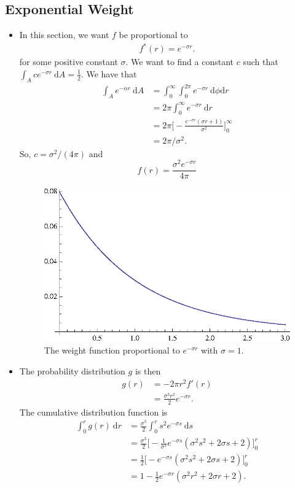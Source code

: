 \documentclass[10pt]{article}
\newcommand{\dee}{\mathrm{d}}
\begin{document}
\subsection{Exponential Weight}
\begin{itemize}
	\item In this section, we want $f$ be proportional to 
		\begin{align*}
			f^*(r) = e^{-\sigma r}.
		\end{align*}
		for some positive constant $\sigma$.
		We want to find a constant $c$ such that 
		$\int_A ce^{-\sigma r}\ \dee A = \frac{1}{2}.$ 
		We have that
		\begin{align*}
			\int_A e^{-\alpha r}\ \dee A 
			&= \int_0^\infty \int_0^{2\pi} e^{-\sigma r}\ \dee \phi \dee r\\
			&= 2\pi \int_0^{\infty} e^{-\sigma r} \ \dee r\\
			&= 2\pi \bigg[ - 
				\frac{e^{-\sigma r}(\sigma r  + 1)}{\sigma^2} \bigg]_0^\infty\\
			&= 2\pi /\sigma^2.
		\end{align*}
		So, $c = \sigma^2 / (4\pi)$ and 
		$$f(r) = \frac{\sigma^2 e^{-\sigma r}}{4\pi} $$

		\begin{figure}[h]
			\centering
			\includegraphics{exponential.eps}
			\caption{The weight function proportional to $e^{-\sigma r}$ with $\sigma = 1$.}
		\end{figure}		
	
	\item The probability distribution $g$ is then
		\begin{align*}
			g(r) 
			&= -2\pi r^2 f'(r)\\
			&= \frac{\sigma^3 r^2}{2} e^{-\sigma r}.
		\end{align*}
		The cumulative distribution function is
		\begin{align*}
			\int_0^r g(r)\ \dee r
			&= \frac{\sigma^3}{2} \int_0^r s^2 e^{-\sigma s}\ \dee s\\
			&= \frac{\sigma^3}{2} 
				\bigg[ - \frac{1}{\sigma^3} e^{-\sigma s} 
				(\sigma^2 s^2 + 2\sigma s + 2)\bigg]_0^r\\
			&= \frac{1}{2} 
				\bigg[- e^{-\sigma s} 
				(\sigma^2 s^2 + 2\sigma s + 2) \bigg]_0^r\\
			&= 1 - \frac{1}{2} e^{-\sigma r} 
				(\sigma^2 r^2 + 2\sigma r + 2).
		\end{align*}
\end{itemize}
\end{document}
